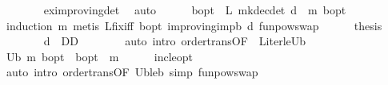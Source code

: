 \begin{isabellebody}
\ \ \ \ \ \ \isamarkupfalse%
\ ex{\isacharunderscore}{\kern0pt}improving{\isacharunderscore}{\kern0pt}det\ \isamarkupfalse%
\ auto\isanewline
\ \ \ \ \isamarkupfalse%
\ {\isachardoublequoteopen}{\isasymnu}\isactrlsub b{\isacharunderscore}{\kern0pt}opt\ {\isacharequal}{\kern0pt}\ {\isacharparenleft}{\kern0pt}L\ {\isacharparenleft}{\kern0pt}mk{\isacharunderscore}{\kern0pt}dec{\isacharunderscore}{\kern0pt}det\ d{\isacharparenright}{\kern0pt}\ {\isacharcircum}{\kern0pt}{\isacharcircum}{\kern0pt}\ m{\isacharparenright}{\kern0pt}\ {\isasymnu}\isactrlsub b{\isacharunderscore}{\kern0pt}opt{\isachardoublequoteclose}\isanewline
\ \ \ \ \ \ \isamarkupfalse%
\ {\isacharparenleft}{\kern0pt}induction\ m{\isacharparenright}{\kern0pt}\ {\isacharparenleft}{\kern0pt}metis\ L{\isacharunderscore}{\kern0pt}{\isasymnu}{\isacharunderscore}{\kern0pt}fix{\isacharunderscore}{\kern0pt}iff\ {\isasymL}\isactrlsub b{\isacharunderscore}{\kern0pt}opt\ {\isasymnu}{\isacharunderscore}{\kern0pt}improving{\isacharunderscore}{\kern0pt}imp{\isacharunderscore}{\kern0pt}{\isasymL}\isactrlsub b\ d{\isacharparenleft}{\kern0pt}{}{\isacharparenright}{\kern0pt}\ funpow{\isacharunderscore}{\kern0pt}swap{}{\isacharparenright}{\kern0pt}{\isacharplus}{\kern0pt}\isanewline
\ \ \ \ \isamarkupfalse%
\ {\isacharquery}{\kern0pt}thesis\isanewline
\ \ \ \ \ \ \isamarkupfalse%
\ {\isacartoucheopen}d\ {\isasymin}\ D\isactrlsub D{\isacartoucheclose}\isanewline
\ \ \ \ \ \ \isamarkupfalse%
\ {\isacharparenleft}{\kern0pt}auto\ intro{\isacharbang}{\kern0pt}{\isacharcolon}{\kern0pt}\ order{\isachardot}{\kern0pt}trans{\isacharbrackleft}{\kern0pt}OF\ {\isacharunderscore}{\kern0pt}\ L{\isacharunderscore}{\kern0pt}iter{\isacharunderscore}{\kern0pt}le{\isacharunderscore}{\kern0pt}U\isactrlsub b{\isacharbrackright}{\kern0pt}{\isacharparenright}{\kern0pt}\isanewline
\ \ \isamarkupfalse%
\isanewline
\ \ \isamarkupfalse%
\ {\isachardoublequoteopen}U\isactrlsub b\ m\ {\isasymnu}\isactrlsub b{\isacharunderscore}{\kern0pt}opt\ {\isasymle}\ {\isasymnu}\isactrlsub b{\isacharunderscore}{\kern0pt}opt{\isachardoublequoteclose}\ \ m\isanewline
\ \ \ \ \isamarkupfalse%
\ {\isasymL}{\isacharunderscore}{\kern0pt}inc{\isacharunderscore}{\kern0pt}le{\isacharunderscore}{\kern0pt}opt\isanewline
\ \ \ \ \isamarkupfalse%
\ {\isacharparenleft}{\kern0pt}auto\ intro{\isacharbang}{\kern0pt}{\isacharcolon}{\kern0pt}\ order{\isachardot}{\kern0pt}trans{\isacharbrackleft}{\kern0pt}OF\ U\isactrlsub b{\isacharunderscore}{\kern0pt}le{\isacharunderscore}{\kern0pt}{\isasymL}\isactrlsub b{\isacharbrackright}{\kern0pt}\ simp{\isacharcolon}{\kern0pt}\ funpow{\isacharunderscore}{\kern0pt}swap{}{\isacharparenright}{\kern0pt}\isanewline

\end{isabellebody}
